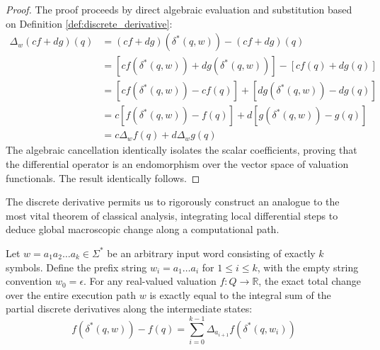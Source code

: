 \begin{proof}
The proof proceeds by direct algebraic evaluation and substitution based on Definition \ref{def:discrete_derivative}:
\begin{align*}
\Delta_w(cf + dg)(q) &= (cf + dg)(\delta^*(q, w)) - (cf + dg)(q) \\
&= \left[ c f(\delta^*(q, w)) + d g(\delta^*(q, w)) \right] - \left[ c f(q) + d g(q) \right] \\
&= \left[ c f(\delta^*(q, w)) - c f(q) \right] + \left[ d g(\delta^*(q, w)) - d g(q) \right] \\
&= c \left[ f(\delta^*(q, w)) - f(q) \right] + d \left[ g(\delta^*(q, w)) - g(q) \right] \\
&= c\Delta_w f(q) + d\Delta_w g(q)
\end{align*}
The algebraic cancellation identically isolates the scalar coefficients, proving that the differential operator is an endomorphism over the vector space of valuation functionals. The result identically follows.
\end{proof}

The discrete derivative permits us to rigorously construct an analogue to the most vital theorem of classical analysis, integrating local differential steps to deduce global macroscopic change along a computational path.

\begin{theorem}
\label{thm:ftc_automata}
Let $w = a_1 a_2 \dots a_k \in \Sigma^*$ be an arbitrary input word consisting of exactly $k$ symbols. Define the prefix string $w_i = a_1 \dots a_i$ for $1 \le i \le k$, with the empty string convention $w_0 = \epsilon$. For any real-valued valuation $f: Q \to \mathbb{R}$, the exact total change over the entire execution path $w$ is exactly equal to the integral sum of the partial discrete derivatives along the intermediate states:
\[
f(\delta^*(q, w)) - f(q) = \sum_{i=0}^{k-1} \Delta_{a_{i+1}} f(\delta^*(q, w_i))
\]
\end{theorem}

